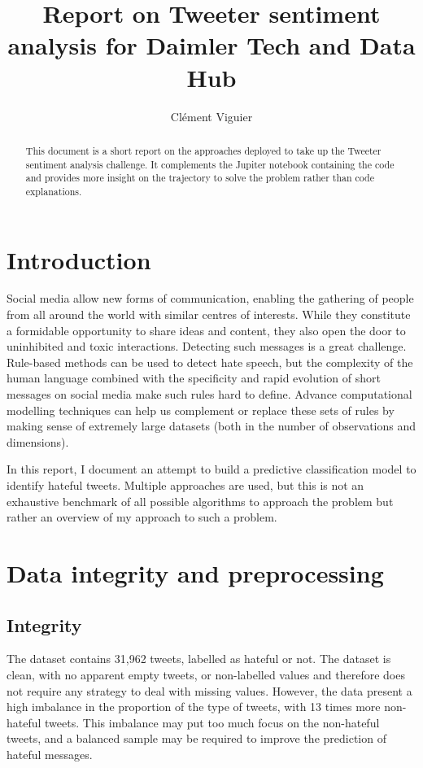 \documentclass[a4paper, justified]{tufte-handout}
\title{Report on Tweeter sentiment analysis for Daimler Tech and Data Hub}
\author{Clément Viguier}
\begin{document}
\maketitle%

\begin{fullwidth}
\begin{abstract}
\noindent
This document is a short report on the approaches deployed to take up the Tweeter sentiment analysis challenge. It complements the Jupiter notebook containing the code and provides more insight on the trajectory to solve the problem rather than code explanations.
\end{abstract}

\section{Introduction}
Social media allow new forms of communication, enabling the gathering of people from all around the world with similar centres of interests. While they constitute a formidable opportunity to share ideas and content, they also open the door to uninhibited and toxic interactions. Detecting such messages is a great challenge. Rule-based methods can be used to detect hate speech, but the complexity of the human language combined with the specificity and rapid evolution of short messages on social media make such rules hard to define. Advance computational modelling techniques can help us complement or replace these sets of rules by making sense of extremely large datasets (both in the number of observations and dimensions).

In this report, I document an attempt to build a predictive classification model to identify hateful tweets. Multiple approaches are used, but this is not an exhaustive benchmark of all possible algorithms to approach the problem but rather an overview of my approach to such a problem.

\section{Data integrity and preprocessing}

\subsection{Integrity}

The dataset contains 31,962 tweets, labelled as hateful or not. The dataset is clean, with no apparent empty tweets, or non-labelled values and therefore does not require any strategy to deal with missing values.
However, the data present a high imbalance in the proportion of the type of tweets, with 13 times more non-hateful tweets. This imbalance may put too much focus on the non-hateful tweets, and a balanced sample may be required to improve the prediction of hateful messages.


\end{fullwidth}
\end{document}
